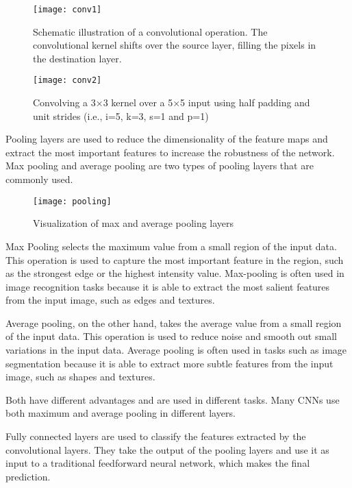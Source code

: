 \begin{figure}[H]
  \centering
  \texttt{[image: conv1]}
  \caption{Schematic illustration of a convolutional operation. The convolutional kernel shifts over the source layer, filling the pixels in the destination layer. \cite{convolutional:operation}}
\end{figure}

\begin{figure}[H]
  \centering
  \texttt{[image: conv2]}
  \caption{Convolving a 3×3 kernel over a 5×5 input using half padding
  and unit strides (i.e., i=5, k=3, s=1 and p=1) \cite{arxiv.1603.07285}}
\end{figure}

Pooling layers are used to reduce the dimensionality of the feature maps and extract the most important features to increase the robustness of the network.
Max pooling and average pooling are two types of pooling layers that are commonly used. 

\begin{figure}[H]
  \centering
  \texttt{[image: pooling]}
  \caption{Visualization of max and average pooling layers \cite{boehmke}}
\end{figure}

Max Pooling selects the maximum value from a small region of the input data.
This operation is used to capture the most important feature in the region, such as the strongest edge or the highest intensity value.
Max-pooling is often used in image recognition tasks because it is able to extract the most salient features from the input image, such as edges and textures.

Average pooling, on the other hand, takes the average value from a small region of the input data. 
This operation is used to reduce noise and smooth out small variations in the input data. 
Average pooling is often used in tasks such as image segmentation because it is able to extract more subtle features from the input image, such as shapes and textures.

Both have different advantages and are used in different tasks.
Many CNNs use both maximum and average pooling in different layers.


Fully connected layers are used to classify the features extracted by the convolutional layers.
They take the output of the pooling layers and use it as input to a traditional feedforward neural network, which makes the final prediction.


